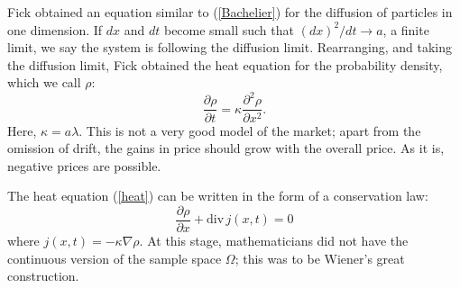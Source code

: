 Fick obtained an equation similar to (\ref{Bachelier}) for the
diffusion of particles in one dimension.
If $dx$ and $dt$ become small such that $(dx)^2/dt\rightarrow a$, a finite
limit, we say the system is following the diffusion limit. Rearranging,
and taking the diffusion limit,
Fick obtained the heat equation for the probability density, which we call
$\rho$:
\begin{equation}
\frac{\partial \rho}{\partial t}=\kappa\frac{\partial^2\rho}{\partial x^2}.
\label{heat}
\end{equation}
Here, $\kappa=a\lambda$. This is not a very good model of the market; apart
from the omission of drift, the gains in price should grow with the
overall price. As it is, negative prices are possible.

The heat equation (\ref{heat}) can be written
in the form of a conservation law:
\begin{equation}
\frac{\partial \rho}{\partial x}+\mbox{div}\,j(x,t)=0
\end{equation}
where $j(x,t)=-\kappa\nabla \rho$. At this stage,
mathematicians did not have the continuous version of the sample space
$\Omega$; this was to be Wiener's great construction.



